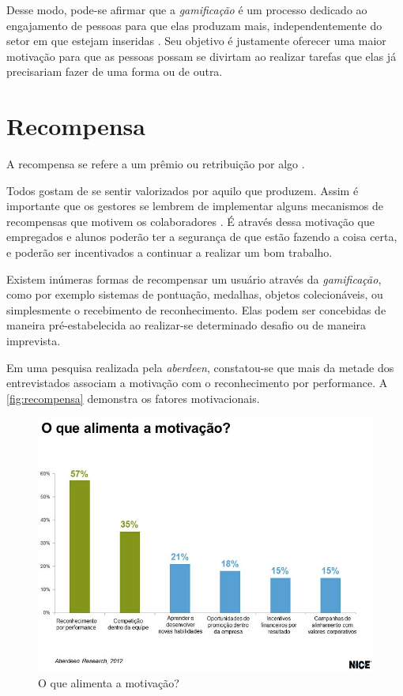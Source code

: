 Desse modo, pode-se afirmar que a \textit{gamificação} é um processo dedicado ao engajamento de pessoas para que elas produzam mais, independentemente do setor em que estejam inseridas
\cite{gamificacao-corporativa:2017}. Seu objetivo é justamente oferecer uma maior motivação para que as pessoas possam se divirtam ao realizar tarefas que elas já precisariam fazer de uma forma ou de outra.


\section{Recompensa}
A recompensa se refere a um prêmio ou retribuição por algo \cite{dicio-recompensa:2009}.


Todos gostam de se sentir valorizados por aquilo que produzem. Assim é importante que os gestores se lembrem de implementar alguns mecanismos de recompensas que motivem os colaboradores \cite{gamificacao-corporativa:2017}. É através dessa motivação que empregados e alunos poderão ter a segurança de que estão fazendo a coisa certa, e poderão ser incentivados a continuar a realizar um bom trabalho.

Existem inúmeras formas de recompensar um usuário através da \textit{gamificação}, como por exemplo sistemas de pontuação, medalhas, objetos colecionáveis, ou simplesmente o recebimento de reconhecimento. Elas podem ser concebidas de maneira pré-estabelecida ao realizar-se determinado desafio ou de maneira imprevista.


Em uma pesquisa realizada pela \textit{\gls{aberdeen}}, constatou-se que mais da metade dos entrevistados associam a motivação com o reconhecimento por performance. A \autoref{fig:recompensa} demonstra os fatores motivacionais.

\begin{figure}[htb]
    \centering
	\includegraphics[width=16cm]{imagens/recompensa.jpg}
	\caption{\label{fig:recompensa}O que alimenta a motivação?}
\end{figure}

